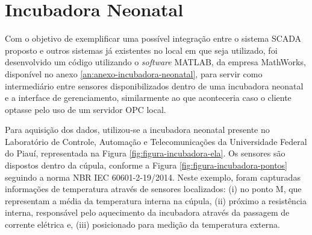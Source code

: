 \section{Incubadora Neonatal}
\label{sec:incubadora-neonatal}
Com o objetivo de exemplificar uma possível integração entre o sistema \gls{SCADA} proposto e outros sistemas já existentes no local em que seja utilizado, foi desenvolvido um código utilizando o \textit{software} MATLAB, da empresa MathWorks, disponível no anexo \ref{an:anexo-incubadora-neonatal}, para servir como intermediário entre sensores disponibilizados dentro de uma incubadora neonatal e a interface de gerenciamento, similarmente ao que aconteceria caso o cliente optasse pelo uso de um servidor \gls{OPC} local. 
        \begin{figure}[!h]
    	\end{figure}
    	
Para aquisição dos dados, utilizou-se a incubadora neonatal presente no Laboratório de Controle, Automação e Telecomunicações da Universidade Federal do Piauí, representada na Figura \ref{fig:figura-incubadora-ela}. Os sensores são dispostos dentro da cúpula, conforme a Figura \ref{fig:figura-incubadora-pontos} seguindo a norma NBR IEC 60601-2-19/2014. Neste exemplo, foram capturadas informações de temperatura através de sensores localizados: (i) no ponto M, que representam a média da temperatura interna na cúpula, (ii) próximo a resistência interna, responsável pelo aquecimento da incubadora através da passagem de corrente elétrica  e, (iii) posicionado para medição da temperatura externa.
    	
